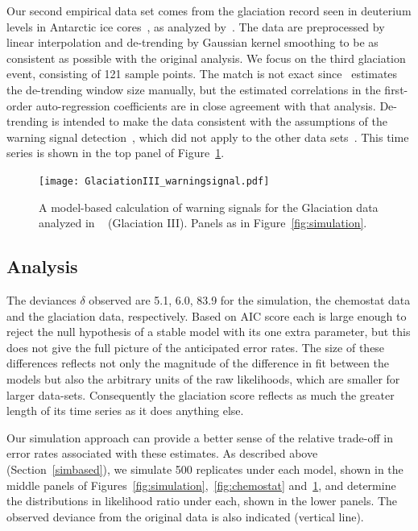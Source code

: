 \documentclass[authoryear,review,11pt]{elsarticle}
\begin{document}
Our second empirical data set comes from the glaciation record seen
in deuterium levels in Antarctic ice cores~\citep{Petit1999},
as analyzed by~\citet{Dakos2008}.
The data are preprocessed by linear interpolation and de-trending by Gaussian kernel smoothing
to be as consistent as possible with the original analysis.
We focus on the third glaciation event, consisting of 121 sample points.
The match is not exact since~\citet{Dakos2008} estimates the de-trending window size manually,
but the estimated correlations in the first-order auto-regression coefficients are in close agreement with that analysis.
De-trending is intended to make the data consistent with the assumptions of the warning signal detection~\citep{Dakos2008},
which did not apply to the other data sets~\citep{Drake2010}.
This time series is shown in the top panel of Figure~\ref{fig:glaciation}.
 \begin{figure}
   \begin{center}
     \texttt{[image: GlaciationIII\_warningsignal.pdf]}
     \caption{A model-based calculation of warning signals for the Glaciation data analyzed in ~\citet{Dakos2008} (Glaciation III).  Panels as in Figure~\ref{fig:simulation}.}
     \label{fig:glaciation}
  \end{center}
 \end{figure}


\subsection*{Analysis}
The deviances $\delta$ observed are 5.1, 6.0, 83.9 for the simulation,
the chemostat data and the glaciation data, respectively.
Based on AIC score each is large enough to reject the null hypothesis of a stable model 
with its one extra parameter, but this does not give the full picture of the anticipated error rates.  
The size of these differences reflects not only the magnitude of the difference in fit
between the models but also the arbitrary units of the raw likelihoods,
which are smaller for larger data-sets.
Consequently the glaciation score reflects as much the greater length of its time series as it does anything else.
 

Our simulation approach can provide a better sense of the relative trade-off in error rates associated
with these estimates.  
As described above (Section~\ref{simbased}), we simulate 500 replicates under each model, 
shown in the middle panels of Figures~\ref{fig:simulation},~\ref{fig:chemostat} and~\ref{fig:glaciation},
and determine the distributions in likelihood ratio under each, shown in the lower panels.  
The observed deviance from the original data is also indicated (vertical line).
\end{document}
